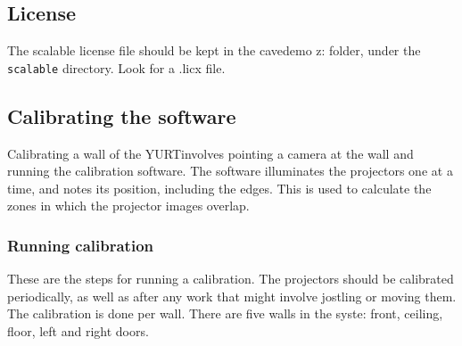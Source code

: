 \documentclass[11pt]{article}
\newcommand{\yurt}{YURT}
\newcommand{\cmd}[1]{\texttt{#1}}
\begin{document}
\subsection{License}

The scalable license file should be kept in the cavedemo z: folder,
under the \cmd{scalable} directory.  Look for a .licx file.

\subsection{Calibrating the software}

Calibrating a wall of the \yurt involves pointing a camera at the wall
and running the calibration software.  The software illuminates the
projectors one at a time, and notes its position, including the edges.
This is used to calculate the zones in which the projector images
overlap.

\subsubsection{Running calibration}

These are the steps for running a calibration.  The projectors should
be calibrated periodically, as well as after any work that might
involve jostling or moving them.  The calibration is done per wall.
There are five walls in the syste: front, ceiling, floor, left and
right doors.
\end{document}
